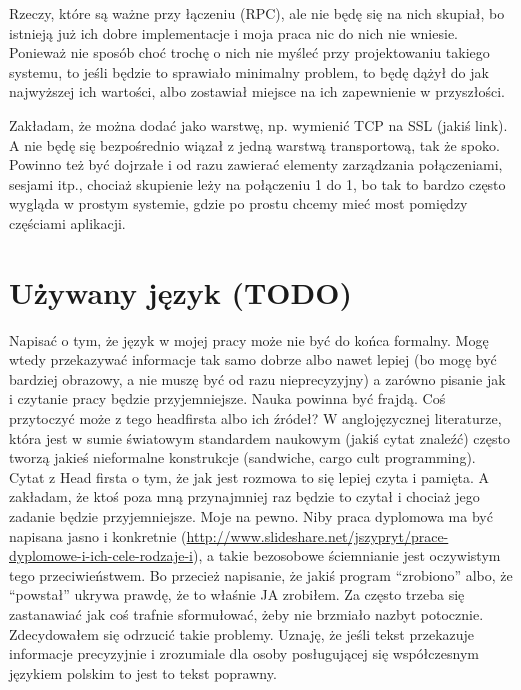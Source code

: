 Rzeczy, które są ważne przy łączeniu (RPC), ale nie będę się na nich skupiał, bo istnieją już ich dobre implementacje i moja praca nic do nich nie wniesie. Ponieważ nie sposób choć trochę o nich nie myśleć przy projektowaniu takiego systemu, to jeśli będzie to sprawiało minimalny problem, to będę dążył do jak najwyższej ich wartości, albo zostawiał miejsce na ich zapewnienie w przyszłości.
\begin{description}
Zakładam, że można dodać jako warstwę, np. wymienić TCP na SSL (jakiś link). A nie będę się bezpośrednio wiązał z jedną warstwą transportową, tak że spoko.
Powinno też być dojrzałe i od razu zawierać elementy zarządzania połączeniami, sesjami itp., chociaż skupienie leży na połączeniu 1 do 1, bo tak to bardzo często wygląda w prostym systemie, gdzie po prostu chcemy mieć most pomiędzy częściami aplikacji.
\end{description}

\section{Używany język (TODO)}
Napisać o tym, że język w mojej pracy może nie być do końca formalny. Mogę wtedy przekazywać informacje tak samo dobrze albo nawet lepiej (bo mogę być bardziej obrazowy, a nie muszę być od razu nieprecyzyjny) a zarówno pisanie jak i czytanie pracy będzie przyjemniejsze. Nauka powinna być frajdą. Coś przytoczyć może z tego headfirsta albo ich źródeł? W anglojęzycznej literaturze, która jest w sumie światowym standardem naukowym (jakiś cytat znaleźć) często tworzą jakieś nieformalne konstrukcje (sandwiche, cargo cult programming). Cytat z Head firsta o tym, że jak jest rozmowa to się lepiej czyta i pamięta. A zakładam, że ktoś poza mną przynajmniej raz będzie to czytał i chociaż jego zadanie będzie przyjemniejsze. Moje na pewno. Niby praca dyplomowa ma być napisana jasno i konkretnie (\url{http://www.slideshare.net/jszypryt/prace-dyplomowe-i-ich-cele-rodzaje-i}), a takie bezosobowe ściemnianie jest oczywistym tego przeciwieństwem. Bo przecież napisanie, że jakiś program ``zrobiono'' albo, że ``powstał'' ukrywa prawdę, że to właśnie JA zrobiłem. Za często trzeba się zastanawiać jak coś trafnie sformułować, żeby nie brzmiało nazbyt potocznie. Zdecydowałem się odrzucić takie problemy. Uznaję, że jeśli tekst przekazuje informacje precyzyjnie i zrozumiale dla osoby posługującej się współczesnym językiem polskim to jest to tekst poprawny.

